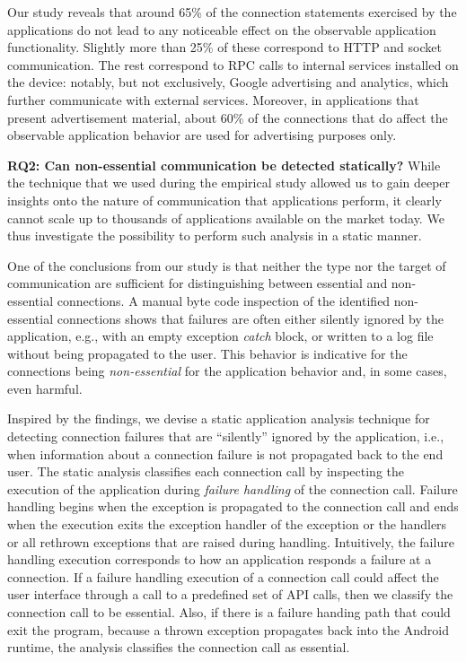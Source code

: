 Our study reveals that around 65\% of the connection statements exercised by the applications do not lead to any noticeable effect on the observable application functionality.
Slightly more than 25\% of these correspond to HTTP and socket communication. The rest correspond to RPC calls to internal services installed on the device: notably, but not exclusively, Google advertising and analytics, which further communicate with external services. 
Moreover, in applications that present advertisement material, about 60\% of the connections that do affect the observable application behavior are used for advertising purposes only.

\vspace{0.1in}
\noindent 
{\bf RQ2: Can non-essential communication be detected statically?}
While the technique that we used during the empirical study allowed us to gain deeper insights onto the nature of communication that applications perform, it clearly cannot scale up to thousands of applications available on the market today.
We thus investigate the possibility to perform such analysis in a static manner. 
 
One of the conclusions from our study is that neither the type nor the target of communication are sufficient for distinguishing between essential and non-essential connections.
A manual byte code inspection of the identified non-essential connections shows that failures are often either silently ignored by the application, e.g., with an empty exception \emph{catch} block, or written to a log file without being propagated to the user. 
This behavior is indicative for the connections being \emph{non-essential} for the application behavior and, in some cases, even harmful. 

Inspired by the findings, we devise a static application analysis
technique for detecting connection failures that are ``silently''
ignored by the application, i.e., when information about a connection
failure is not propagated back to the end user.  The static analysis
classifies each connection call by inspecting the execution of the
application during {\it failure handling} of the connection call.
Failure handling begins when the exception is propagated to the
connection call and ends when the execution exits the exception
handler of the exception or the handlers or all rethrown exceptions
that are raised during handling.  Intuitively, the failure handling
execution corresponds to how an application responds a failure at a
connection.  If a failure handling execution of a connection call
could affect the user interface through a call to a predefined set of
API calls, then we classify the connection call to be essential.
Also, if there is a failure handing path that could exit the program,
because a thrown exception propagates back into the Android
runtime, the analysis classifies the connection call as essential.

